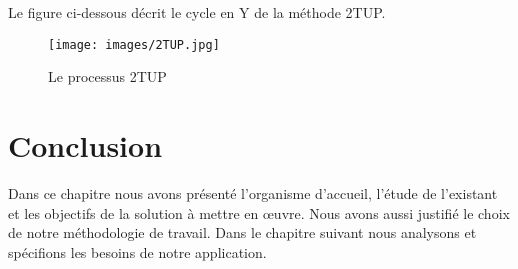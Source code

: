 {Le figure ci-dessous décrit le cycle en Y de la méthode 2TUP. 
\begin{figure}[H]
\centering
\texttt{[image: images/2TUP.jpg]}
\caption{Le processus 2TUP}
\end{figure}








\section*{Conclusion}
Dans ce chapitre nous avons présenté l'organisme d'accueil, l'étude de l'existant et les objectifs de la solution à mettre en œuvre. Nous avons aussi justifié le choix de notre méthodologie de travail. Dans le chapitre suivant nous analysons et spécifions les besoins de notre application.









}

